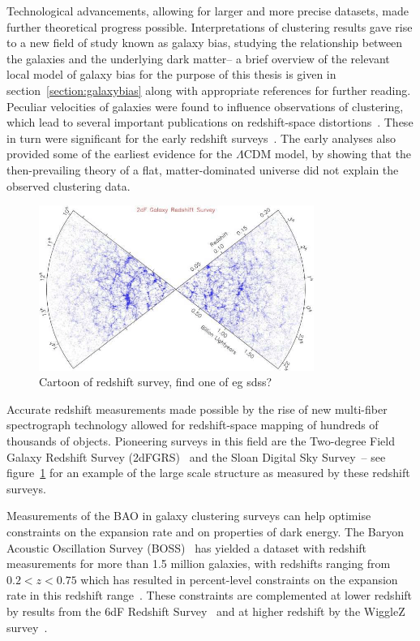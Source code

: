 Technological advancements, allowing for larger and more precise datasets, made further theoretical progress possible. Interpretations of clustering results gave rise to a new field of study known as galaxy bias, studying the relationship between the galaxies and the underlying dark matter-- a brief overview of the relevant local model of galaxy bias for the purpose of this thesis is given in section~\ref{section:galaxybias} along with appropriate references for further reading. Peculiar velocities of galaxies were found to influence observations of clustering, which lead to several important publications on redshift-space distortions~\cite{Kaiser:1987qv}. These in turn were significant for the early redshift surveys~\cite{Cole:1994wf,Loveday:1995gk,Tadros:1999ky}. The early analyses also provided some of the earliest evidence for the $\Lambda$CDM model, by showing that the then-prevailing theory of a flat, matter-dominated universe did not explain the observed clustering data.

\begin{figure}[ht]
	\centering
	\includegraphics[width=0.8\textwidth]{fig/placeholder_redshiftsurvey.png}
	\caption{Cartoon of redshift survey, find one of eg sdss?}
	\label{fig:redshiftsurveypicture}
\end{figure}

Accurate redshift measurements made possible by the rise of new multi-fiber spectrograph technology allowed for redshift-space mapping of hundreds of thousands of objects. Pioneering surveys in this field are the Two-degree Field Galaxy Redshift Survey (2dFGRS)~\cite{2DFGRS:2001zay} and the Sloan Digital Sky Survey~\cite{SDSS:2000hjo}-- see figure~\ref{fig:redshiftsurveypicture} for an example of the large scale structure as measured by these redshift surveys.

Measurements of the BAO in galaxy clustering surveys can help optimise constraints on the expansion rate and on properties of dark energy. The Baryon Acoustic Oscillation Survey (BOSS)~\cite{Dawson:2012} has yielded a dataset with redshift measurements for more than 1.5 million galaxies, with redshifts ranging from $0.2 < z < 0.75$ which has resulted in percent-level constraints on the expansion rate in this redshift range~\cite{BOSS:2016wmc}. These constraints are complemented at lower redshift by results from the 6dF Redshift Survey~\cite{Beutler:2011} and at higher redshift by the WiggleZ survey~\cite{Blake:2011a,Blake:2011b}. 

